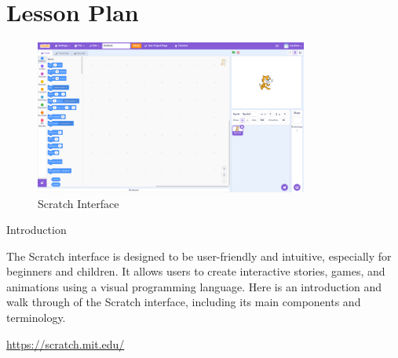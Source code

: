 \documentclass[main.tex]{subfiles}
\begin{document}
\section*{Lesson Plan}

\begin{figure}[h]
  \centering
  \includegraphics[width=0.8\textwidth]{../images/scratch_interface.png}
  \caption{Scratch Interface}
  \label{fig:scratch_interface}
\end{figure}

{Introduction}
{
  The Scratch interface is designed to be user-friendly and intuitive, especially for beginners and children. It allows users to create interactive stories, games, and animations using a visual programming language. Here is an introduction and walk through of the Scratch interface, including its main components and terminology.

}
{\url{https://scratch.mit.edu/}}

\pagebreak[3]
\end{document}
